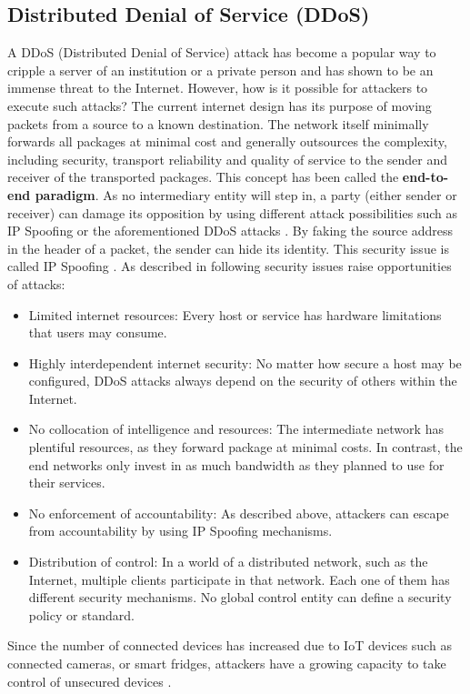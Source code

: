\subsection{Distributed Denial of Service (DDoS)}
\label{subsec:03_ddos}


A DDoS (Distributed Denial of Service) attack has become a popular way to cripple a server of an institution or a private person and has shown to be an immense threat to the Internet. However, how is it possible for attackers to execute such attacks? The current internet design has its purpose of moving packets from a source to a known destination. The network itself minimally forwards all packages at minimal cost and generally outsources the complexity, including security, transport reliability and quality of service to the sender and receiver of the transported packages. This concept has been called the \textbf{end-to-end paradigm}. As no intermediary entity will step in, a party (either sender or receiver) can damage its opposition by using different attack possibilities such as IP Spoofing or the aforementioned DDoS attacks \cite{Mirkovic2004}. By faking the source address in the header of a packet, the sender can hide its identity. This security issue is called IP Spoofing \cite{Cloudflare2019}. As described in \cite{Mirkovic2004} following security issues raise opportunities of attacks:
\begin{itemize}
  \item Limited internet resources: Every host or service has hardware limitations that users may consume.
  \item Highly interdependent internet security: No matter how secure a host may be configured, DDoS attacks always depend on the security of others within the Internet.
  \item No collocation of intelligence and resources: The intermediate network has plentiful resources, as they forward package at minimal costs.  In contrast, the end networks only invest in as much bandwidth as they planned to use for their services.
  \item No enforcement of accountability: As described above, attackers can escape from accountability by using IP Spoofing mechanisms.
  \item Distribution of control: In a world of a distributed network, such as the Internet, multiple clients participate in that network. Each one of them has different security mechanisms. No global control entity can define a security policy or standard.
\end{itemize}
Since the number of connected devices has increased due to IoT devices such as connected cameras, or smart fridges, attackers have a growing capacity to take control of unsecured devices \cite{Rodrigues2017}.

